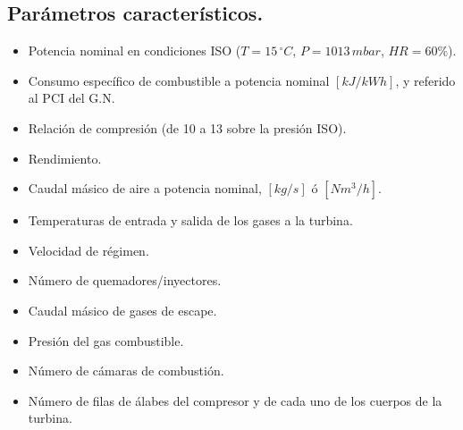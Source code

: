 		\subsection{Parámetros característicos.}
			\begin{itemize}
				\item Potencia nominal en condiciones ISO ($T=15\,^\circ C$, $P = 1013\,mbar$, $HR = 60\%$).
				\item Consumo específico de combustible a potencia nominal $[kJ/kWh]$, y referido al PCI del G.N.
				\item Relación de compresión (de 10 a 13 sobre la presión ISO).
				\item Rendimiento.
				\item Caudal másico de aire a potencia nominal, $[kg/s]$ ó $[Nm^3/h]$.
				\item Temperaturas de entrada y salida de los gases a la turbina.
				\item Velocidad de régimen.
				\item Número de quemadores/inyectores.
				\item Caudal másico de gases de escape.
				\item Presión del gas combustible.
				\item Número de cámaras de combustión.
				\item Número de filas de álabes del compresor y de cada uno de los cuerpos de la turbina.
			\end{itemize}
		

